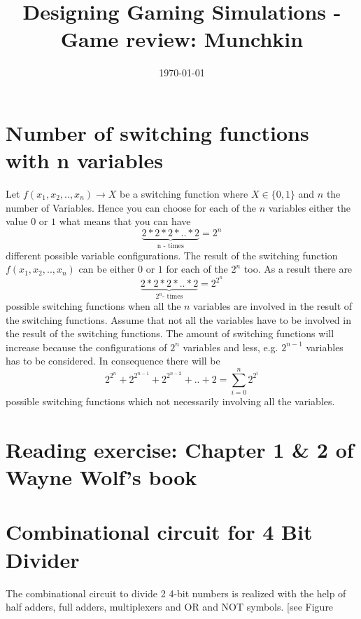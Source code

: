 \documentclass[a4paper,10pt]{scrartcl}
\title{Designing Gaming Simulations  - Game review: Munchkin}
\author{\Authors}
\date{\today}
\begin{document}
\maketitle

\section{Number of switching functions with n variables}

Let  $ f(x_{1}, x_{2}, .. , x_{n}) \rightarrow X$ be a switching function where $X \in \{0,1\}$ and $n$ the number of Variables. Hence you can choose for each of the $n$ variables either the value $0$ or $1$ what means that you can have $$\underbrace{2*2*2* .. * 2}_\text{n - times}= 2^{n}$$ different possible variable configurations. The result of the switching function $ f(x_{1}, x_{2}, .. , x_{n})$ can be either $0$ or $1$ for each of the $2^{n}$ too. As a result there are $$\underbrace{2 * 2 * 2 * .. * 2}_{2^{n}\text{- times}} = 2 ^{2^{n}}$$ possible switching functions when all the $n$ variables are involved in the result of the switching functions. \newline \newline
Assume that not all the variables have to be involved in the result of the switching functions. The amount of switching functions will increase because the configurations of $2^{n}$ variables and less, e.g. $2^{n-1}$ variables has to be considered. In consequence there will be $$ 2 ^{2^{n}} + 2 ^{2^{n -1}} + 2 ^{2^{n -2}} + .. + 2 = \sum\limits_{i=0}^n 2 ^{2^{i}}$$ possible switching functions which not necessarily involving all the variables.

\section{Reading exercise: Chapter 1 \& 2 of Wayne Wolf’s book}

\section{Combinational circuit for 4 Bit Divider}

The combinational circuit to divide 2 4-bit numbers is realized with the help of half adders, full adders, multiplexers and OR and NOT symbols. [see Figure %
\end{document}
